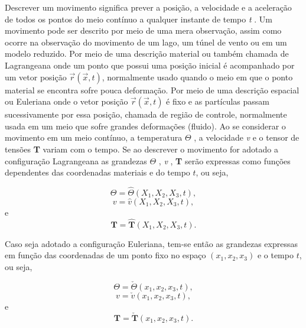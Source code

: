 Descrever um movimento significa prever a posição, a velocidade e a aceleração de todos os pontos do meio contínuo a qualquer instante de tempo \textit{t} \cite{Lai}.
Um movimento pode ser descrito por meio de uma mera observação, assim como ocorre na observação do movimento de um lago, um túnel de vento ou em um modelo reduzido. Por meio de uma descrição material ou também chamada de Lagrangeana onde um ponto que possui uma posição  inicial é acompanhado por um vetor posição $ \vec{r} ( \vec{x}, \textit{t} )$, normalmente usado quando o meio em que o ponto material se encontra sofre pouca deformação. Por meio de uma descrição espacial ou Euleriana onde o vetor posição  $ \vec{r} ( \vec{x}, \textit{t} )$ é fixo e as partículas passam sucessivamente por essa posição, chamada de região de controle, normalmente usada em um meio que sofre grandes deformações (fluido).
Ao se considerar o movimento em um meio contínuo, a temperatura $\Theta$ , a velocidade \textit{v} e o tensor de tensões \textbf{T} variam com o tempo. Se ao descrever o movimento for adotado a configuração Lagrangeana as grandezas $\Theta$ , \textit{v} , \textbf{T} serão expressas como funções dependentes das coordenadas materiais e do tempo $ t $, ou seja,

\begin{equation}
\Theta= \widehat{\Theta} (X_{1} , X_{2} , X_{3} , \textit{t} ),
\end{equation}
\begin{equation}
\textit{v}=\widehat{ \textit{v} } (X_{1} , X_{2} , X_{3} , \textit{t} ),  \label{equacao 1}
\end{equation}
e
\begin{equation}
\textbf{T}= \widehat{\textbf{T}}(X_{1} , X_{2} , X_{3} , \textit{t} ).
\end{equation}

Caso seja adotado a configuração Euleriana, tem-se então as grandezas expressas em função das coordenadas de um ponto fixo no espaço $(x_{1}, x_{2}, x_{3})$ e o tempo $ t $, ou seja,

\begin{equation}
\Theta=\check{ \Theta } (x_{1} , x_{2} , x_{3} , \textit{t} ),
\end{equation}
\begin{equation}
\textit{v}=\check{ \textit{v} } (x_{1} , x_{2} , x_{3} , \textit{t} ),  \label{equacao 1}
\end{equation}
e
\begin{equation}
\textbf{T}= \check{ \textbf{T} }(x_{1} , x_{2} , x_{3} , \textit{t} ).
\end{equation}

